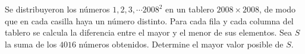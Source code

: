Se distribuyeron los números $1,2,3, \cdots 2008^2$ en un tablero $2008 \times 2008$, de modo que en cada casilla haya un número distinto. Para cada fila y cada columna del tablero se calcula la diferencia entre el mayor y el menor de sus elementos. Sea $S$ la suma de los $4016$ números obtenidos. Determine el mayor valor posible de $S$.
